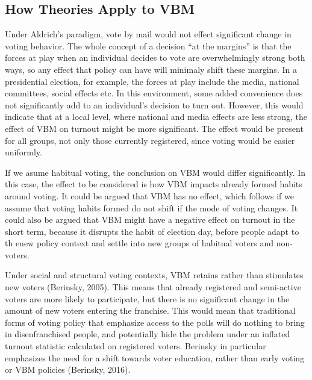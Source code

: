 \documentclass[12pt,twoside]{reedthesis}
\begin{document}
  \subsection{How Theories Apply to VBM}\label{how-theories-apply-to-vbm}
  
  Under Aldrich's paradigm, vote by mail would not effect significant
  change in voting behavior. The whole concept of a decision ``at the
  margins'' is that the forces at play when an individual decides to vote
  are overwhelmingly strong both ways, so any effect that policy can have
  will minimaly shift these margins. In a presidential election, for
  example, the forces at play include the media, national committees,
  social effects etc. In this environment, some added convenience does not
  significantly add to an individual's decision to turn out. However, this
  would indicate that at a local level, where national and media effects
  are less strong, the effect of VBM on turnout might be more significant.
  The effect would be present for all groups, not only those currently
  registered, since voting would be easier uniformly.
  
  If we asume habitual voting, the conclusion on VBM would differ
  significantly. In this case, the effect to be considered is how VBM
  impacts already formed habits around voting. It could be argued that VBM
  has no effect, which follows if we assume that voting habits formed do
  not shift if the mode of voting changes. It could also be argued that
  VBM might have a negative effect on turnout in the short term, because
  it disrupts the habit of election day, before people adapt to th enew
  policy context and settle into new groups of habitual voters and
  non-voters.
  
  Under social and structural voting contexts, VBM retains rather than
  stimulates new voters (Berinsky, 2005). This means that already
  registered and semi-active voters are more likely to participate, but
  there is no significant change in the amount of new voters entering the
  franchise. This would mean that traditional forms of voting policy that
  emphasize access to the polls will do nothing to bring in
  disenfranchised people, and potentially hide the problem under an
  inflated turnout statistic calculated on registered voters. Berinsky in
  particular emphasizes the need for a shift towards voter education,
  rather than early voting or VBM policies (Berinsky, 2016).
  
\end{document}
